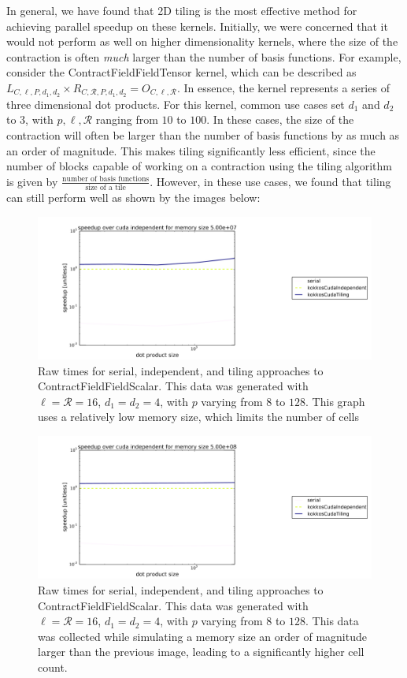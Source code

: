 In general, we have found that 2D tiling is the most effective method for achieving parallel speedup on these kernels. Initially, we were concerned that it would not perform as well on higher dimensionality kernels, where the size of the contraction is often \textit{much} larger than the number of basis functions. For example, consider the ContractFieldFieldTensor kernel, which can be described as $L_{C,\ell,P,d_1,d_2} \times R_{C, \mathcal{R}, P,d_1,d_2} = O_{C,\ell, \mathcal{R}}$. In essence, the kernel represents a series of three dimensional dot products. For this kernel, common use cases set $d_1$ and $d_2$ to $3$, with $p, \ell, \mathcal{R}$ ranging from $10$ to $100$. In these cases, the size of the contraction will often be larger than the number of basis functions by as much as an order of magnitude. This makes tiling significantly less efficient, since the number of blocks capable of working on a contraction using the tiling algorithm is given by $\frac{\text{number of basis functions}}{\text{size of a tile}}$. However, in these use cases, we found that tiling can still perform well as shown by the images below: 

\begin{figure}[H]
    \centering
\includegraphics[scale = .2]{CFFTTiling1}
\caption{Raw times for serial, independent, and tiling approaches to ContractFieldFieldScalar. This data was generated with $\ell=\mathcal{R}=16$, $d_1=d_2=4$, with $p$ varying from $8$ to $128$. This graph uses a relatively low memory size, which limits the number of cells}
\end{figure}

\begin{figure}[H]
    \centering
\includegraphics[scale = .2]{CFFTTiling2}
\caption{Raw times for serial, independent, and tiling approaches to ContractFieldFieldScalar. This data was generated with $\ell=\mathcal{R}=16$, $d_1=d_2=4$, with $p$ varying from $8$ to $128$. This data was collected while simulating a memory size an order of magnitude larger than the previous image, leading to a significantly higher cell count. }
\end{figure}
 

